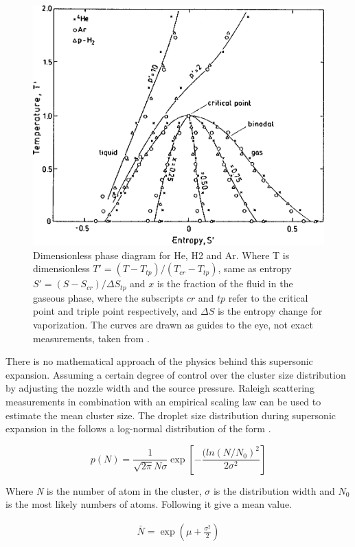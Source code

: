 \begin{figure}[h!]
	\centering
	\includegraphics[width= 8 cm]{../Images/dimensiones isentropic diagram.png}
	\caption[helium isentropic diagram]{Dimensionless phase diagram for He, H2 and Ar. Where T is dimensionless $T'=(T -T_{tp})/(T_{cr}-T_{tp})$, same as entropy $S'=(S-S_{cr})/\Delta S_{tp}$ and $x$ is the fraction of the fluid in the gaseous phase, where the subscripts $cr$ and $tp$ refer to the critical point and triple point respectively, and $\Delta S$ is the entropy change for vaporization. The curves are drawn as guides to the eye, not exact measurements, taken from \cite{knuth_average_1999}.}
	\label{fig:tsHe} 
\end{figure}
  

There is no mathematical approach of the physics behind this supersonic expansion. Assuming a certain degree of control over the cluster size distribution by adjusting the nozzle width and the source pressure. Raleigh scattering measurements in combination with an empirical scaling law \cite{hagena_cluster_1972} can be used to estimate the mean cluster size. The droplet size distribution during supersonic expansion in the follows a log-normal distribution of the form \cite{harms_density_1998}.

\begin{equation}
p(N) = \frac{1}{\sqrt{2\pi}N \sigma} \exp  \left[- \frac{(ln(N/N_{0})^2}{2\sigma^2} \right]
\end{equation}

Where \textit{N} is the number of atom in the cluster, $\sigma$ is the distribution width and \textit{$N_{0}$} is the most likely numbers of atoms. Following it give a mean value.

\begin{align}
\bar N = \exp  \left(\mu+\frac{\sigma^2}{2} \right)
\end{align}

